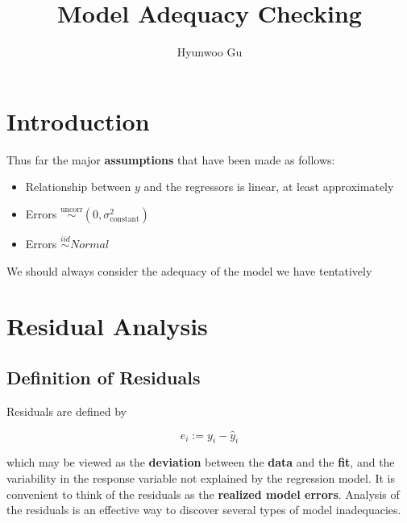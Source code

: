 \documentclass[12pt]{article}
\begin{document}
\title{\textbf{Model Adequacy Checking}}
\author{Hyunwoo Gu}
\date{}

\maketitle


\section{Introduction}

Thus far the major \textbf{assumptions} that have been made as follows:

\begin{itemize}
  \item Relationship between $y$ and the regressors is linear, at least approximately
  \item Errors $\overset{\text{uncorr}}{\sim} (0, \sigma^2_{\text{constant}})$ 
  \item Errors $\overset{iid}{\sim} Normal$
\end{itemize}

We should always consider the adequacy of the model we have tentatively 

\section{Residual Analysis}

\subsection{Definition of Residuals}

Residuals are defined by

$$
e_i := y_i - \hat{y}_i
$$

which may be viewed as the \textbf{deviation} between the \textbf{data} and the \textbf{fit}, and the variability in the response variable not explained by the regression model. It is convenient to think of the residuals as the \textbf{realized model errors}. Analysis of the residuals is an effective way to discover several types of model inadequacies. 
\end{document}
